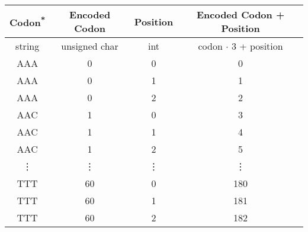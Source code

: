 \begingroup\centering
\begin{tabular}{c|c|c|c}
Codon\textsuperscript{*} & Encoded Codon & Position & Encoded Codon + Position\\
\hline
string & unsigned char & int & codon $\cdot$ 3 + position\\
\hline\hline
AAA & 0 & 0 & 0\\
AAA & 0 & 1 & 1\\
AAA & 0 & 2 & 2\\
AAC & 1 & 0 & 3\\
AAC & 1 & 1 & 4\\
AAC & 1 & 2 & 5\\
\vdots & \vdots & \vdots & \vdots\\
TTT & 60 & 0 & 180\\
TTT & 60 & 1 & 181\\
TTT & 60 & 2 & 182\\
\end{tabular}
\par\endgroup